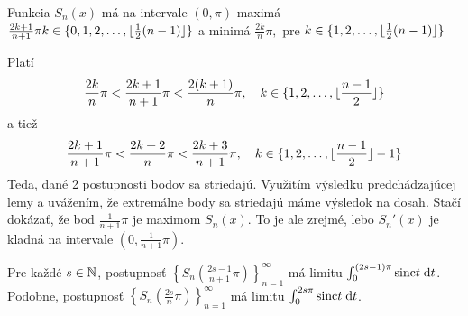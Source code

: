 \begin{lema}
    Funkcia $S_n(x)$ má na intervale $(0,\pi)$ maximá
    $\frac{2k+1}{n+1}\pi k \in \{0,1,2,\dots,\lfloor \frac{1}{2}(n-1) \rfloor \}$
    a minimá
    $\frac{2k}{n}\pi, $ pre
    $k \in \{1,2,\dots,\lfloor \frac{1}{2}(n-1) \rfloor \}$
\end{lema}
\begin{dokaz}
    Platí
    \begin{equation}
        \frac{2k}{n}\pi < \frac{2k+1}{n+1}\pi < \frac{2(k+1)}{n} \pi,
        \quad k \in \{1,2,\dots,\lfloor \frac{n-1}{2} \rfloor \}
    \end{equation}
    a tiež
    \begin{equation}
        \frac{2k+1}{n+1}\pi < \frac{2k+2}{n}\pi < \frac{2k+3}{n+1} \pi,
        \quad k \in\{1,2,\dots,\lfloor \frac{n-1}{2} \rfloor-1 \}
    \end{equation}
    Teda, dané 2 postupnosti bodov sa striedajú. Využitím výsledku
    predchádzajúcej lemy a uvážením, že extremálne body sa striedajú
    máme výsledok na dosah. Stačí dokázať, že bod $\frac{1}{n+1}\pi$
    je maximom $S_n(x)$. To je ale zrejmé, lebo
     $S_n'(x)$ je kladná na intervale $(0, \frac{1}{n+1}\pi)$.
\end{dokaz}

\begin{veta}
Pre každé $s\in\mathbb{N}$, postupnosť
$\left\{S_n\left( \frac{2s-1}{n+1}\pi\right)\right\}_{n=1}^{\infty}$
má limitu $\int_0^{(2s-1)\pi} {\rm sinc} t \; \mathrm{d} t$. Podobne, postupnosť
$\left\{S_n\left( \frac{2s}{n}\pi\right)\right\}_{n=1}^{\infty}$
má limitu $\int_0^{2s\pi} {\rm sinc} t \; \mathrm{d} t$.
\end{veta}

